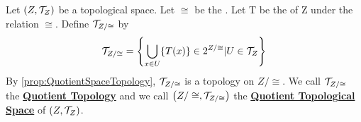 \label{def:QuotientSpaceTopology}
\newcommand{\QuotientSpaceTopology}[0]{\textbf{\hyperref[def:QuotientSpaceTopology]{Quotient Topology}}\xspace}
\newcommand{\QuotientTopologicalSpace}[0]{\textbf{\hyperref[def:QuotientSpaceTopology]{Quotient Topological Space}}\xspace}

\begin{df}
    Let $(Z,\mathcal{T}_Z)$ be a topological space. 
    Let $\cong$ be the . 
    Let T be the \QuotientMap of Z under the relation $\cong$. 
    Define $\mathcal{T}_{Z/\cong}$ by
    \begin{equation}
        \mathcal{T}_{Z/\cong} = \left\{ \bigcup_{x \in U}\{T(x)\} \in 2^{Z/\cong}| U \in \mathcal{T}_Z \right\}
    \end{equation}
    By \ref{prop:QuotientSpaceTopology}, $\mathcal{T}_{Z/\cong}$ is a topology on $Z/\cong$.
    We call $\mathcal{T}_{Z/\cong}$ the \QuotientSpaceTopology and we call $\left( Z/\cong, \mathcal{T}_{Z/\cong}\right)$ the \QuotientTopologicalSpace of $(Z, \mathcal{T}_Z)$.
    
\end{df}
